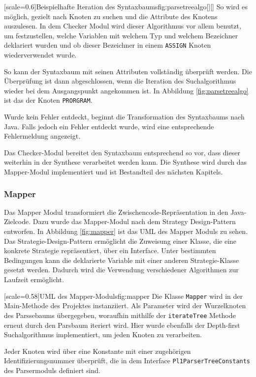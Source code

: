 [scale=0.6]{Beispielhafte Iteration des Syntaxbaums}{fig:parsetreealgo}[][]
\pagebreak
So wird es möglich, gezielt nach Knoten zu suchen und die Attribute des Knotens auszulesen.
In dem Checker Modul wird dieser Algorithmus vor allem benutzt, um festzustellen, welche Variablen mit welchem Typ und welchem Bezeichner deklariert wurden und ob dieser Bezeichner in einem \verb+ASSIGN+ Knoten wiederverwendet wurde.

So kann der Syntaxbaum mit seinen Attributen vollständig überprüft werden.
Die Überprüfung ist dann abgeschlossen, wenn die Iteration des Suchalgorithmus wieder bei dem Ausgangspunkt angekommen ist. In Abbildung \ref{fig:parsetreealgo} ist das der Knoten \verb+PRORGRAM+.

Wurde kein Fehler entdeckt, beginnt die Transformation des Syntaxbaums nach Java. Falls jedoch ein Fehler entdeckt wurde, wird eine entsprechende Fehlermeldung angezeigt.

Das Checker-Modul bereitet den Syntaxbaum entsprechend so vor, dass dieser weiterhin in der Synthese verarbeitet werden kann.
Die Synthese wird durch das Mapper-Modul implementiert und ist Bestandteil des nächsten Kapitels.
 
\subsubsection{Mapper}
Das Mapper Modul transformiert die Zwischencode-Repräsentation in den Java-Zielcode. Dazu wurde das Mapper-Modul nach dem Strategy Design-Pattern entworfen.
In Abbildung \ref{fig:mapper} ist das UML des Mapper Moduls zu sehen. 
Das Strategie-Design-Pattern ermöglicht die Zuweisung einer Klasse, die eine konkrete Strategie repräsentiert, über ein Interface. Unter bestimmten Bedingungen kann die deklarierte Variable mit einer anderen Strategie-Klasse gesetzt werden. Dadurch wird die Verwendung verschiedener Algorithmen zur Laufzeit ermöglicht. 

[scale=0.58]{UML des Mapper-Moduls}{fig:mapper}
\pagebreak
Die Klasse \verb+Mapper+ wird in der Main-Methode des Projektes instanziiert. Als Parameter wird der Wurzelknoten des Parssebaums übergegeben,
woraufhin mithilfe der \verb+iterateTree+ Methode erneut durch den Parsbaum iteriert wird. Hier wurde ebenfalls der Depth-first Suchalgorithmus implementiert, um jeden Knoten zu verarbeiten. 

Jeder Knoten wird über eine Konstante mit einer zugehörigen Identifizierungsnummer überprüft, die in dem Interface \verb+Pl1ParserTreeConstants+ des Parsermoduls definiert sind. 

